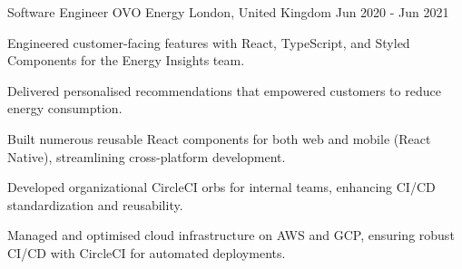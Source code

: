 \begin{cventries}
{\begin{cvitems}
      \end{cvitems}
    }

\cventry
    {Software Engineer} %
    {OVO Energy} %
    {London, United Kingdom} %
    {Jun 2020 - Jun 2021} %
    {
      \begin{cvitems} %
        \item {Engineered customer-facing features with React, TypeScript, and Styled Components for the Energy Insights team.}
        \item {Delivered personalised recommendations that empowered customers to reduce energy consumption.}
        \item {Built numerous reusable React components for both web and mobile (React Native), streamlining cross-platform development.}
        \item {Developed organizational CircleCI orbs for internal teams, enhancing CI/CD standardization and reusability.}
        \item {Managed and optimised cloud infrastructure on AWS and GCP, ensuring robust CI/CD with CircleCI for automated deployments.}
      \end{cvitems}
    }

\end{cventries}
